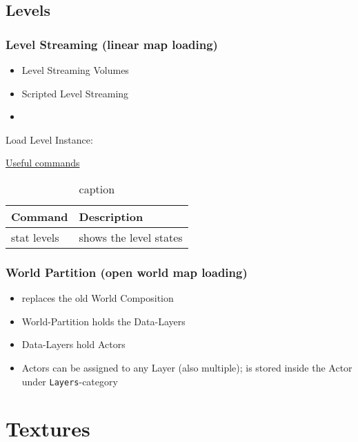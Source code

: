 \documentclass{scrbook}
\newcommand{\code}[1]{\colorbox{mygray}{\lstinline|#1|}}
\begin{document}
        \section{Levels}
            \subsection{Level Streaming (linear map loading)}
                \begin{itemize}
                    \item Level Streaming Volumes
                    \item Scripted Level Streaming
                    \item 
                \end{itemize}

                Load Level Instance:

            \underline{Useful commands}
            \begin{table}[!htb]
                \begin{tabular}{|l|l|}
                    \hline
                        Command & Description \\
                    \hline
                        stat levels & shows the level states \\
                    \hline
                \end{tabular}
            \caption{ caption }
            \end{table}

            

            \subsection{World Partition (open world map loading)}
                \begin{itemize}
                    \item replaces the old World Composition
                    \item World-Partition holds the Data-Layers
                    \item Data-Layers hold Actors
                    \item Actors can be assigned to any Layer (also multiple); is stored inside the Actor under \code{Layers}-category
                    
                \end{itemize}
                \chapter{Textures}
\end{document}
